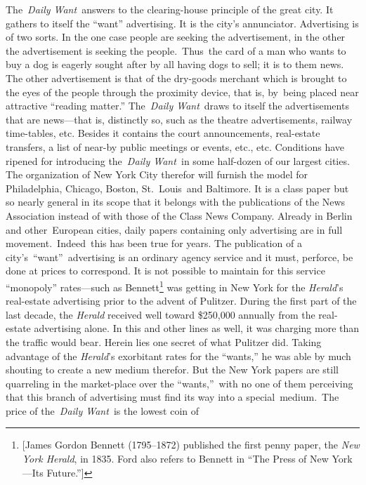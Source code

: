 \documentclass[twoside,symmetric,nobib,justified]{tufte-book}
\begin{document}
The~\emph{Daily Want~}answers to the clearing-house principle of the
great city. It gathers to itself the ``want'' advertising. It is the
city's annunciator. Advertising is of two sorts. In the one case people
are seeking the advertisement, in the other the advertisement is seeking
the people.~Thus~the card of a man who wants to buy a dog is eagerly
sought after by all having dogs to sell; it is to them news. The other
advertisement is that of the dry-goods merchant which is brought to the
eyes of the people through the proximity device, that is, by~being
placed near attractive ``reading matter.'' The~\emph{Daily Want}~draws
to itself the advertisements that are news---that is, distinctly so,
such as the theatre advertisements, railway time-tables, etc. Besides it
contains the court announcements, real-estate transfers, a list of
near-by public meetings or events, etc., etc. Conditions have ripened
for introducing the~\emph{Daily Want~}in some half-dozen of our largest
cities. The organization of New York City therefor will furnish the
model for Philadelphia, Chicago, Boston, St.~Louis~and Baltimore. It is
a class paper but so nearly general in its scope that it belongs with
the publications of the News Association instead of with those of the
Class News Company. Already in Berlin and other~European cities, daily
papers containing only advertising are in full movement.~Indeed~this has
been true for years. The publication of a city's~``want''~advertising is
an ordinary agency service and it must, perforce, be done at prices to
correspond. It is not possible to maintain for this service ``monopoly''
rates---such as Bennett\footnote{{[}James Gordon Bennett (1795--1872)
  published the first penny paper, the \emph{New York Herald}, in 1835.
  Ford also refers to Bennett in ``The Press of New York---Its
  Future.''{]}} was getting in New York for the \emph{Herald}'s
real-estate advertising prior to the advent of Pulitzer. During the
first part of the last decade, the \emph{Herald} received well toward
\$250,000 annually from the real-estate advertising alone. In this and
other lines as well, it was charging more than the traffic would bear.
Herein lies one secret of what Pulitzer did. Taking advantage of the
\emph{Herald}'s exorbitant rates for the ``wants,'' he was able by much
shouting to create a new medium therefor. But the New York papers are
still quarreling in the market-place over the ``wants,''~with no one of
them perceiving that this branch of advertising must find its way into a
special~medium.~The price of the\emph{~Daily Want~}is the lowest coin of
\end{document}

